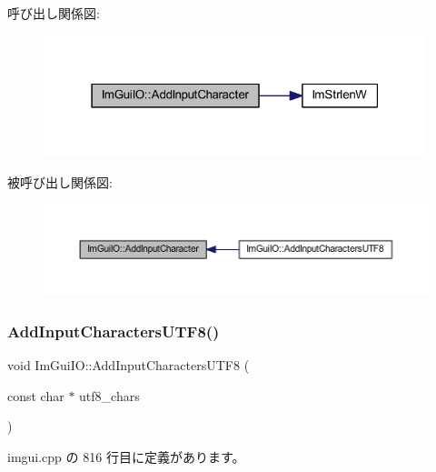 呼び出し関係図\+:\nopagebreak
\begin{figure}[H]
\begin{center}
\leavevmode
\includegraphics[width=316pt]{struct_im_gui_i_o_a52b6bdef9278de5ae2031311a269cf14_cgraph}
\end{center}
\end{figure}
被呼び出し関係図\+:\nopagebreak
\begin{figure}[H]
\begin{center}
\leavevmode
\includegraphics[width=350pt]{struct_im_gui_i_o_a52b6bdef9278de5ae2031311a269cf14_icgraph}
\end{center}
\end{figure}
\mbox{\label{struct_im_gui_i_o_adaf150a1908c02c3cae15a35915bbb26}} 
\subsubsection{\texorpdfstring{Add\+Input\+Characters\+U\+T\+F8()}{AddInputCharactersUTF8()}}
{\footnotesize\ttfamily void Im\+Gui\+I\+O\+::\+Add\+Input\+Characters\+U\+T\+F8 (\begin{DoxyParamCaption}\item[{const char $\ast$}]{utf8\+\_\+chars }\end{DoxyParamCaption})}



 imgui.\+cpp の 816 行目に定義があります。

